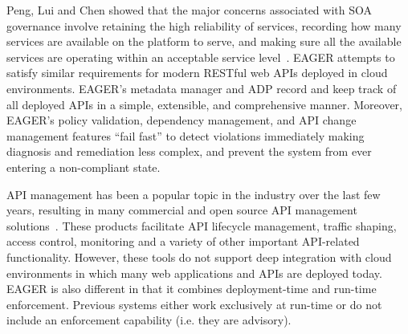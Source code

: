Peng, Lui and Chen showed that
the major concerns associated with SOA governance 
involve retaining the high reliability of services, recording how many services
are available on the platform to serve, and making sure all the available 
services are operating within an acceptable service
level~\cite{4730489}. EAGER attempts to satisfy similar requirements for 
modern RESTful web APIs deployed in cloud environments. 
EAGER's metadata manager and ADP record and keep track of all deployed APIs 
in a simple, extensible, and comprehensive manner.  Moreover, EAGER's policy
validation, dependency management, and API change management features 
``fail fast'' to detect violations immediately making
diagnosis and remediation less complex, and prevent
the system from ever entering a non-compliant state.

API management has been a popular topic in the industry over the last few years, resulting
in many commercial and open source API management solutions~\cite{wso2am,apigee,layer7,mashery}. These products facilitate
API lifecycle management, traffic shaping, access control, monitoring and a variety of other
important API-related functionality. However, these tools do not support deep integration with
cloud environments in which many web applications and APIs are deployed today. 
EAGER is also different in that it combines deployment-time and run-time
enforcement.  Previous systems either work exclusively at run-time or do not
include an enforcement capability (i.e. they are advisory).
%
